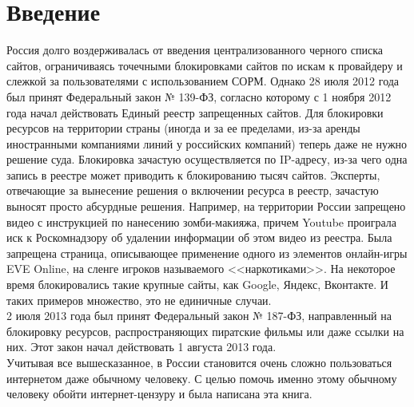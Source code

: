 \chapter{Введение}
Россия долго воздерживалась от введения централизованного черного списка сайтов, ограничиваясь точечными блокировками сайтов по искам к провайдеру и слежкой за пользователями с использованием СОРМ. Однако 28 июля 2012 года был принят Федеральный закон № 139-ФЗ, согласно которому с 1 ноября 2012 года начал действовать Единый реестр запрещенных сайтов. Для блокировки ресурсов на территории страны (иногда и за ее пределами, из-за аренды иностранными компаниями линий у российских компаний) теперь даже не нужно решение суда. Блокировка зачастую осуществляется по IP-адресу, из-за чего одна запись в реестре может приводить к блокированию тысяч сайтов. Эксперты, отвечающие за вынесение решения о включении ресурса в реестр, зачастую выносят просто абсурдные решения. Например, на территории России запрещено видео с инструкцией по нанесению зомби-макияжа, причем Youtube проиграла иск к Роскомнадзору об удалении информации об этом видео из реестра\cite{zombie}. Была запрещена страница, описывающее применение одного из элементов онлайн-игры EVE Online, на сленге игроков называемого <<наркотиками>>\cite{eve}. На некоторое время блокировались такие крупные сайты, как Google\cite{google}, Яндекс\cite{yandex}, Вконтакте\cite{vk}. И таких примеров множество, это не единичные случаи.\\
2 июля 2013 года был принят Федеральный закон № 187-ФЗ, направленный на блокировку ресурсов, распространяющих пиратские фильмы или даже ссылки на них. Этот закон начал действовать 1 августа 2013 года.\\
Учитывая все вышесказанное, в России становится очень сложно пользоваться интернетом даже обычному человеку. С целью помочь именно этому обычному человеку обойти интернет-цензуру и была написана эта книга.
